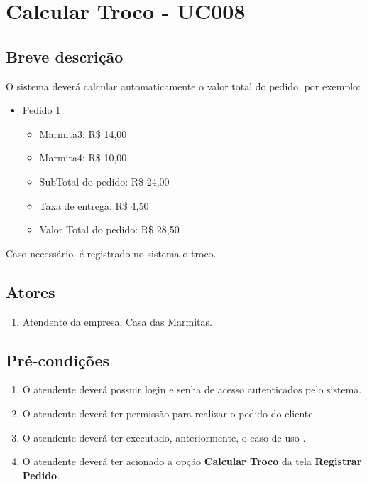 \chapter{Calcular Troco - UC008} \label{uc008}

\section{Breve descrição}

O sistema deverá calcular automaticamente o valor total do pedido, por exemplo:

\begin{itemize}
	\item Pedido 1
	\begin{itemize}
		\item Marmita3: R\$ 14,00
		\item Marmita4: R\$ 10,00
		\item SubTotal do pedido: R\$ 24,00
		\item Taxa de entrega: R\$ 4,50
		\item Valor Total do pedido: R\$ 28,50
	\end{itemize}
\end{itemize}

Caso necessário, é registrado no sistema o troco.

\section{Atores}

\begin{enumerate}
	\item Atendente da empresa, Casa das Marmitas.
\end{enumerate}

\section{Pré-condições}

\begin{enumerate}
	\item O atendente deverá possuir login e senha de acesso autenticados pelo sistema.
	\item O atendente deverá ter permissão para realizar o pedido do cliente.
	\item O atendente deverá ter executado, anteriormente, o caso de uso .
	\item O atendente deverá ter acionado a opção \textbf{Calcular Troco} da tela \textbf{Registrar Pedido}.
\end{enumerate}

